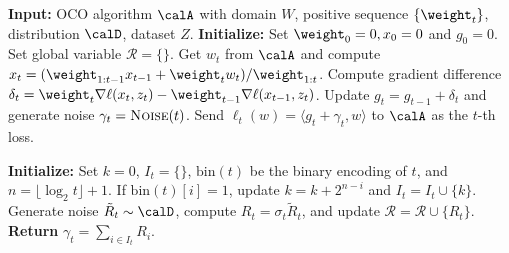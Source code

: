 \begin{algorithm}[ht]
\begin{algorithmic}[1]
    \State \textbf{Input:} OCO algorithm $\calA$ with domain $W$, positive sequence $\{\weight_t\}$, 
    distribution $\calD$, dataset $Z$.
    \State \textbf{Initialize:} Set $\weight_0 = 0, x_0 = 0$ and $g_0 = 0$. Set global variable $\mathcal{R}=\{\}$.
        \State Get $w_t$ from $\calA$ and compute $x_t = (\weight_{1:t-1}x_{t-1}+\weight_tw_t)/\weight_{1:t}$.
        \State Compute gradient difference $\delta_t = \weight_t\nabla\ell(x_t,z_t)-\weight_{t-1}\nabla\ell(x_{t-1},z_t)$.
        \State Update $g_t = g_{t-1}+\delta_t$ and generate noise $\gamma_t=\textsc{Noise}(t)$.
        \State Send $\ell_t(w) = \langle g_t+\gamma_t, w\rangle$ to $\calA$ as the $t$-th loss.
    \EndFor
    
    \vspace{0.5em}
    
        \State \textbf{Initialize: } Set $k=0$, $I_t=\{\}$, $\mathrm{bin}(t)$ be the binary encoding of $t$, and $n=\lfloor \log_2 t\rfloor+1$.
            \State If $\mathrm{bin}(t)[i] = 1$, update $k = k+2^{n-i}$ and $I_t=I_t\cup\{k\}$.
        \EndFor 
        \State Generate noise $\tilde R_t\sim \calD$, compute $R_t=\sigma_t\tilde R_t$, and update $\mathcal{R}=\mathcal{R}\cup\{R_t\}$.
        \State \textbf{Return} $\gamma_t = \sum_{i\in I_t} R_i$.
    \EndFunction
\end{algorithmic}
\caption{Differentially-Private Online-to-Batch}
\label{alg:DP-OTB:main}
\end{algorithm}